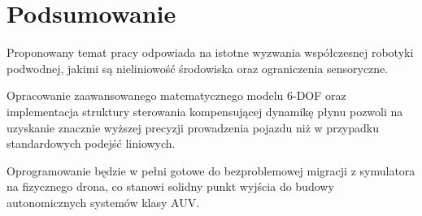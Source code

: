 \section{Podsumowanie}
Proponowany temat pracy odpowiada na istotne wyzwania współczesnej robotyki podwodnej, jakimi są nieliniowość środowiska oraz ograniczenia sensoryczne. 

Opracowanie zaawansowanego matematycznego modelu 6-DOF oraz implementacja struktury sterowania kompensującej dynamikę płynu pozwoli na uzyskanie znacznie wyższej precyzji prowadzenia pojazdu niż w przypadku standardowych podejść liniowych. 

Oprogramowanie będzie w pełni gotowe do bezproblemowej migracji z symulatora na fizycznego drona, co stanowi solidny punkt wyjścia do budowy autonomicznych systemów klasy AUV.